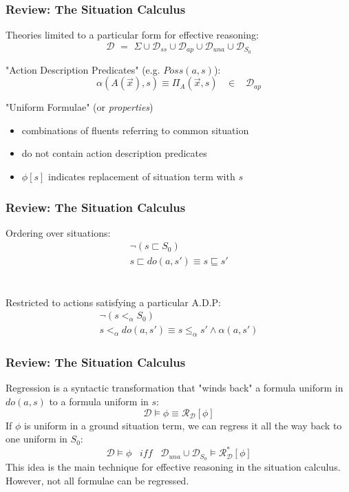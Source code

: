 \documentclass[compress]{beamer}
\begin{document}
\begin{frame}
\frametitle{Review: The Situation Calculus}
Theories limited to a particular form for effective reasoning:
\begin{equation*}
\mathcal{D}\,\,=\,\,\Sigma\cup\mathcal{D}_{ss}\cup\mathcal{D}_{ap}\cup\mathcal{D}_{una}\cup\mathcal{D}_{S_0}
\end{equation*}

"Action Description Predicates" (e.g. $Poss(a,s)$):
\begin{equation*}
\alpha(A(\overrightarrow{x}),s) \equiv \Pi_A(\overrightarrow{x},s)\,\,\,\,\,\in\,\,\,\,\,\mathcal{D}_{ap}
\end{equation*}

"Uniform Formulae" (or \emph{properties})
\begin{itemize}
 \item combinations of fluents referring to common situation
 \item do not contain action description predicates
 \item $\phi[s]$ indicates replacement of situation term with $s$
\end{itemize}

\end{frame}

\begin{frame}
\frametitle{Review: The Situation Calculus}
Ordering over situations:
\begin{gather*}
\neg\left(s \sqsubset S_0\right)\\
s\sqsubset do(a,s')\equiv s\sqsubseteq s'
\end{gather*}
\ \\
\ \\
Restricted to actions satisfying a particular A.D.P:
\begin{gather*}
\neg\left(s <_{\alpha} S_0\right)\\
s <_{\alpha} do(a,s')\equiv s \leq_{\alpha} s' \wedge \alpha(a,s')
\end{gather*}

\end{frame}

\begin{frame}
\frametitle{Review: The Situation Calculus}
Regression is a syntactic transformation that "winds back" a formula
uniform in $do(a,s)$ to a formula uniform in $s$:
\begin{equation*}
\mathcal{D} \models \phi \equiv \mathcal{R}_{\mathcal{D}}[\phi]
\end{equation*}
If $\phi$ is uniform in a ground situation term, we can regress it all the
way back to one uniform in $S_0$:
\begin{equation*}
\mathcal{D} \models \phi\,\,\,\,\,\mathit{iff}\,\,\,\,\,\mathcal{D}_{una}\cup\mathcal{D}_{S_0} \models \mathcal{R}^*_{\mathcal{D}}[\phi]
\end{equation*}
This idea is the main technique for effective reasoning in the situation calculus. However, not all formulae can be regressed.
\end{frame}
\end{document}
